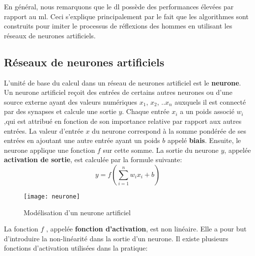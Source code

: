 En général, nous remarquons que le \acrshort{dl} possède des performances élevées par rapport au \acrshort{ml}. Ceci s’explique principalement par le fait que les algorithmes sont construits pour imiter le processus de réflexions des hommes en utilisant les réseaux de neurones artificiels.


    \subsection{Réseaux de neurones artificiels}
    L’unité de base du calcul dans un réseau de neurones artificiel est le \textbf{neurone}. Un neurone artificiel reçoit des entrées de certains autres neurones ou d’une source externe ayant des valeurs numériques $x_1$, $x_2$, ..$x_n$ auxquels il est connecté par des synapses et calcule une sortie $y$. Chaque entrée $x_i$ a un poids associé $w_i$,qui est attribué en fonction de son importance relative par rapport aux autres entrées. La valeur d’entrée $x$ du neurone correspond à la somme pondérée de ses entrées en ajoutant une autre entrée ayant un poids $b$ appelé \textbf{biais}. Ensuite, le neurone applique une fonction $f$ sur cette somme. La sortie du neurone $y$, appelée \textbf{activation de sortie}, est calculée par la formule suivante: 
    \begin{equation}\label{eq:1}
        y = f(\sum_{i = 1}^{n}w_{i}x_{i} + b)
    \end{equation}
    \begin{figure}[H]
        \centering
        \texttt{[image: neurone]}
        \caption{Modélisation d'un neurone artificiel}
    \end{figure}
    La fonction $f$ , appelée \textbf{fonction d’activation}, est non linéaire. Elle a pour but d’introduire la non-linéarité dans la sortie d’un neurone. Il existe plusieurs fonctions d’activation utilisées dans la pratique:
